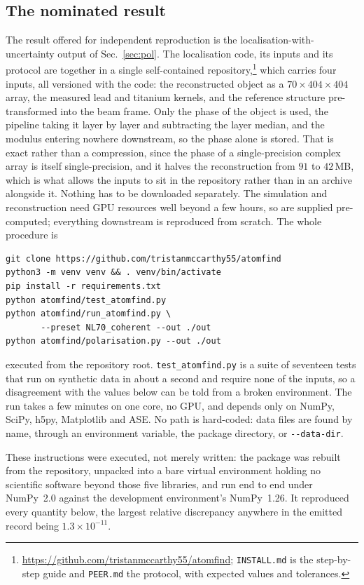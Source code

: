 \documentclass[aps,prb,twocolumn,superscriptaddress,floatfix,nofootinbib]{revtex4-2}
\begin{document}
\subsection{The nominated result}

The result offered for independent reproduction is the localisation-with-uncertainty output of
Sec.~\ref{sec:pol}. The localisation code, its inputs and its protocol are together in a single
self-contained repository,\footnote{\url{https://github.com/tristanmccarthy55/atomfind};
\texttt{INSTALL.md} is the step-by-step guide and \texttt{PEER.md} the protocol, with expected
values and tolerances.} which carries four inputs, all versioned with the code: the
reconstructed object as a $70\times404\times404$ array, the measured lead and titanium kernels,
and the reference structure pre-transformed into the beam frame. Only the phase of the object is
used, the pipeline taking it layer by layer and subtracting the layer median, and the modulus
entering nowhere downstream, so the phase alone is stored. That is exact rather than a
compression, since the phase of a single-precision complex array is itself single-precision, and
it halves the reconstruction from $91$ to $42$\,MB, which is what allows the inputs to sit in the
repository rather than in an archive alongside it. Nothing has to be downloaded separately.
The simulation and reconstruction need GPU resources well beyond a few hours, so are supplied
pre-computed; everything downstream is reproduced from scratch. The whole procedure is
{\footnotesize\begin{verbatim}
git clone https://github.com/tristanmccarthy55/atomfind
python3 -m venv venv && . venv/bin/activate
pip install -r requirements.txt
python atomfind/test_atomfind.py
python atomfind/run_atomfind.py \
       --preset NL70_coherent --out ./out
python atomfind/polarisation.py --out ./out
\end{verbatim}}
executed from the repository root. \texttt{test\_atomfind.py} is a suite of seventeen tests that run on
synthetic data in about a second and require none of the inputs, so a disagreement with the values
below can be told from a broken environment. The run takes a few minutes on one core, no GPU, and
depends only on NumPy, SciPy, h5py, Matplotlib and ASE. No path is hard-coded: data files are
found by name, through an environment variable, the package directory, or \texttt{-{}-data-dir}.

These instructions were executed, not merely written: the package was rebuilt from the
repository, unpacked into a bare virtual environment holding no scientific software beyond those
five libraries, and run end to end under NumPy~2.0 against the development environment's
NumPy~1.26. It reproduced every quantity below, the largest relative discrepancy anywhere in the
emitted record being $1.3\times10^{-11}$.
\end{document}
